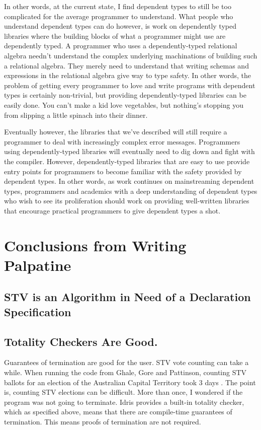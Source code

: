 In other words, at the current state, I find dependent types to still be too
complicated for the average programmer to understand. What people who understand
dependent types can do however, is work on dependently typed libraries where the
building blocks of what a programmer might use are dependently typed. A
programmer who uses a dependently-typed relational algebra needn't understand
the complex underlying machinations of building such a relational algebra. They
merely need to understand that writing schemas and expressions in the relational
algebra give way to type safety. In other words, the problem of getting every
programmer to love and write programs with dependent types is certainly
non-trivial, but providing dependently-typed libraries can be easily done. You
can't make a kid love vegetables, but nothing's stopping you from slipping a
little spinach into their dinner. 

Eventually however, the libraries that we've described will still require a
programmer to deal with increasingly complex error messages. Programmers using
dependently-typed libraries will eventually need to dig down and fight with the
compiler. However, dependently-typed libraries that are easy to use provide
entry points for programmers to become familiar with the safety provided by
dependent types. In other words, as work continues on mainstreaming dependent
types, programmers and academics with a deep understanding of dependent types
who wish to see its proliferation should work on providing well-written
libraries that encourage practical programmers to give dependent types a shot.

\section{Conclusions from Writing Palpatine}

\subsection{STV is an Algorithm in Need of a Declaration Specification}
\subsection{Totality Checkers Are Good.}

Guarantees of termination are good for the user. STV vote counting can take a
while. When running the code from Ghale, Gore and Pattinson, counting STV
ballots for an election of the Australian Capital Territory took 3 days
\cite{stv_haskell}. The point is, counting STV elections can be difficult. More
than once, I wondered if the program was not going to terminate. Idris provides
a built-in totality checker, which as specified above, means that there are
compile-time guarantees of termination. This means proofs of termination are not
required. 

